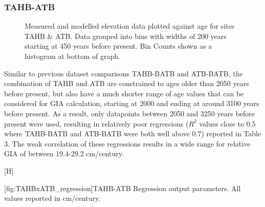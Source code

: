\subsubsection{TAHB-ATB}

\begin{figure}[H]
	\caption{Measured and modelled elevation data plotted against age for sites TAHB \& ATB. Data grouped into bins with widths of 200 years starting at 450 years before present. Bin Counts shown as a histogram at bottom of graph.}	
	\label{fig:data_TAHBxATB}
\end{figure}

Similar to previous dataset comparisons TAHB-BATB and ATB-BATB, the combination of TAHB and ATB are constrained to
ages older than
2050 years before present, but also have a much shorter range
of age values that
can be considered for GIA calculation, starting at 2000 and ending at around 3100 years before present.
As a result, only datapoints between 2050 and 3250 years before present
were used, resulting in
relatively poor regressions ($R^2$ values close to 0.5 where TAHB-BATB and ATB-BATB
were both well above 0.7) reported in Table 3.
The weak correlation of these regressions results in a wide range for
relative GIA of between 19.4-29.2 cm/century. \\


\begin{center}[H]
	\begin{flushleft}
	[fig:TAHBxATB_regression]{TAHB-ATB Regression output parameters. All values reported in cm/century.}
	\end{flushleft}
	
	
\end{center}


